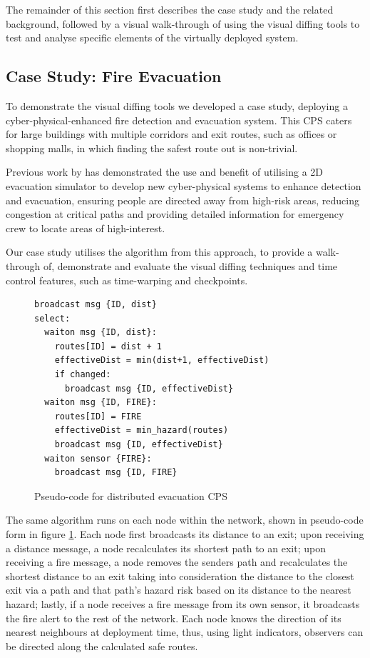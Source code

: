 The remainder of this section first describes the case study and the related background, followed by a visual walk-through of using the visual diffing tools to test and analyse specific elements of the virtually deployed system.

\subsection{Case Study: Fire Evacuation}
\label{ssec:case_study}
To demonstrate the visual diffing tools we developed a case study, deploying a cyber-physical-enhanced fire detection and evacuation system. This CPS caters for large buildings with multiple corridors and exit routes, such as offices or shopping malls, in which finding the safest route out is non-trivial.

Previous work by \cite{doi:10.1093/comjnl/bxq012,7152824} has demonstrated the use and benefit of utilising a 2D evacuation simulator to develop new cyber-physical systems to enhance detection and evacuation, ensuring people are directed away from high-risk areas, reducing congestion at critical paths and providing detailed information for emergency crew to locate areas of high-interest. 

Our case study utilises the algorithm from this approach, to provide a walk-through of, demonstrate and evaluate the visual diffing techniques and time control features, such as time-warping and checkpoints.

\begin{figure}[bht]
\begin{lstlisting}[style=CPSCAL]
broadcast msg {ID, dist}
select:
  waiton msg {ID, dist}:
    routes[ID] = dist + 1
    effectiveDist = min(dist+1, effectiveDist)
    if changed:
      broadcast msg {ID, effectiveDist}
  waiton msg {ID, FIRE}:
    routes[ID] = FIRE
    effectiveDist = min_hazard(routes)
    broadcast msg {ID, effectiveDist}
  waiton sensor {FIRE}:
    broadcast msg {ID, FIRE}
\end{lstlisting}
\caption{Pseudo-code for distributed evacuation CPS}
\label{code:algo}
\end{figure}

The same algorithm runs on each node within the network, shown in pseudo-code form in figure \ref{code:algo}. Each node first broadcasts its distance to an exit; upon receiving a distance message, a node recalculates its shortest path to an exit; upon receiving a fire message, a node removes the senders path and recalculates the shortest distance to an exit taking into consideration the distance to the closest exit via a path and that path's hazard risk based on its distance to the nearest hazard; lastly, if a node receives a fire message from its own sensor, it broadcasts the fire alert to the rest of the network. Each node knows the direction of its nearest neighbours at deployment time, thus, using light indicators, observers can be directed along the calculated safe routes.

